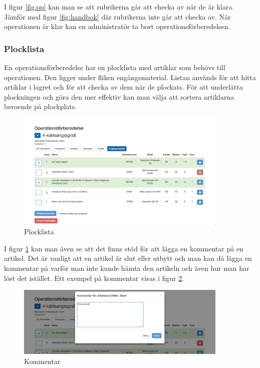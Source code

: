 I figur \ref{fig:op} kan man se att rubrikerna går att checka av när de är klara. Jämför med figur \ref{fig:handbok} där rubrikerna inte går att checka av. När operationen är klar kan en administratör ta bort operationsförberedelsen.
\subsubsection{Plocklista}
En operationsförberedelse har en plocklista med artiklar som behövs till operationen. Den ligger under fliken engångsmaterial.
Listan används för att hitta artiklar i lagret och för att checka av dem när de plockats. För att underlätta plockningen och göra den mer effektiv kan man välja att sortera artiklarna beroende på plockplats.

\begin{figure}[h!]
  \centering
  \includegraphics[width=0.9\textwidth]{images/site/plocklista}
  \caption{Plocklista}
  \label{fig:plocklista}
\end{figure}
I figur \ref{fig:plocklista} kan man även se att det finns stöd för att lägga en kommentar på en artikel.
Det är vanligt att en artikel är slut eller utbytt och man kan då lägga en kommentar på varför man inte kunde hämta den artikeln och även hur man har löst det istället. Ett exempel på kommentar visas i figur \ref{fig:kommentar}.

\begin{figure}[h!]
  \centering
  \includegraphics[width=0.9\textwidth]{images/site/kommentar}
  \caption{Kommentar}
  \label{fig:kommentar}
\end{figure}

